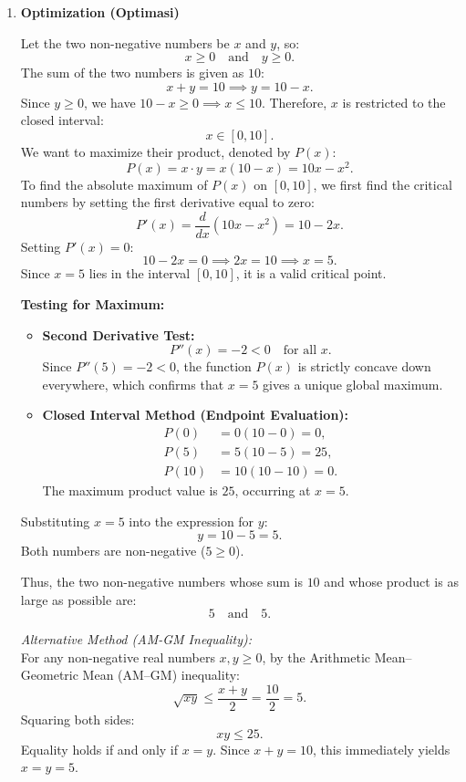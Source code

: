 \documentclass[11pt,a4paper]{article}
\begin{document}
\begin{enumerate}
        \newpage
  \item \textbf{Optimization (Optimasi)}

        Let the two non-negative numbers be $x$ and $y$, so:
        \[
          x \ge 0 \quad\text{and}\quad y \ge 0.
        \]
        The sum of the two numbers is given as $10$:
        \[
          x + y = 10 \implies y = 10 - x.
        \]
        Since $y \ge 0$, we have $10 - x \ge 0 \implies x \le 10$. Therefore, $x$ is restricted to the closed interval:
        \[
          x \in [0, 10].
        \]
        We want to maximize their product, denoted by $P(x)$:
        \[
          P(x) = x \cdot y = x(10 - x) = 10x - x^2.
        \]
        To find the absolute maximum of $P(x)$ on $[0, 10]$, we first find the critical numbers by setting the first derivative equal to zero:
        \[
          P'(x) = \frac{d}{dx}(10x - x^2) = 10 - 2x.
        \]
        Setting $P'(x) = 0$:
        \[
          10 - 2x = 0 \implies 2x = 10 \implies x = 5.
        \]
        Since $x = 5$ lies in the interval $[0, 10]$, it is a valid critical point.

        \textbf{Testing for Maximum:}
        \begin{itemize}
          \item \textbf{Second Derivative Test:}
                \[
                  P''(x) = -2 < 0 \quad \text{for all } x.
                \]
                Since $P''(5) = -2 < 0$, the function $P(x)$ is strictly concave down everywhere, which confirms that $x = 5$ gives a unique global maximum.
          \item \textbf{Closed Interval Method (Endpoint Evaluation):}
                \begin{align*}
                  P(0)  & = 0(10 - 0) = 0,   \\
                  P(5)  & = 5(10 - 5) = 25,  \\
                  P(10) & = 10(10 - 10) = 0.
                \end{align*}
                The maximum product value is $25$, occurring at $x = 5$.
        \end{itemize}

        Substituting $x = 5$ into the expression for $y$:
        \[
          y = 10 - 5 = 5.
        \]
        Both numbers are non-negative ($5 \ge 0$).

        Thus, the two non-negative numbers whose sum is $10$ and whose product is as large as possible are:
        \[
          \boxed{5 \quad\text{and}\quad 5}.
        \]

        \medskip
        \noindent\textit{Alternative Method (AM-GM Inequality):}\\
        For any non-negative real numbers $x, y \ge 0$, by the Arithmetic Mean--Geometric Mean (AM--GM) inequality:
        \[
          \sqrt{xy} \le \frac{x + y}{2} = \frac{10}{2} = 5.
        \]
        Squaring both sides:
        \[
          xy \le 25.
        \]
        Equality holds if and only if $x = y$. Since $x + y = 10$, this immediately yields $x = y = 5$.
\end{enumerate}
\end{document}
